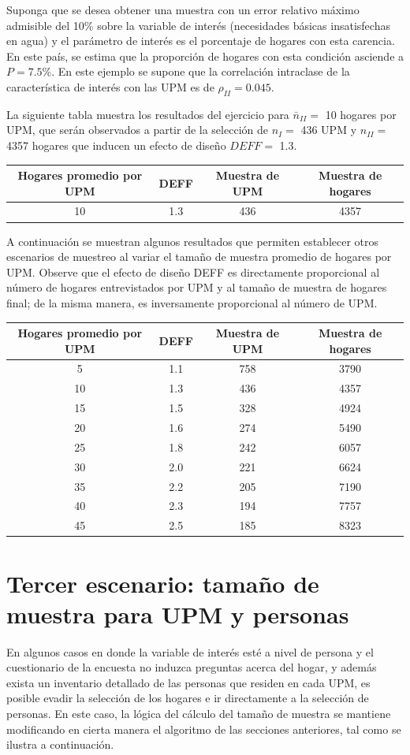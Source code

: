 \documentclass[12pt,spanish,]{book}
\begin{document}
Suponga que se desea obtener una muestra con un error relativo máximo admisible del 10\% sobre la variable de interés (necesidades básicas insatisfechas en agua) y el parámetro de interés es el porcentaje de hogares con esta carencia. En este país, se estima que la proporción de hogares con esta condición asciende a \(P = 7.5\)\%. En este ejemplo se supone que la correlación intraclase de la característica de interés con las UPM es de \(\rho_{II} = 0.045\).

La siguiente tabla muestra los resultados del ejercicio para \(\bar{n}_{II} =\) 10 hogares por UPM, que serán observados a partir de la selección de \(n_{I} =\) 436 UPM y \(n_{II} =\) 4357 hogares que inducen un efecto de diseño \(DEFF =\) 1.3.

\begin{longtable}[]{@{}cccc@{}}
\toprule
Hogares promedio por UPM & DEFF & Muestra de UPM & Muestra de hogares\tabularnewline
\midrule
\endhead
10 & 1.3 & 436 & 4357\tabularnewline
\bottomrule
\end{longtable}

A continuación se muestran algunos resultados que permiten establecer otros escenarios de muestreo al variar el tamaño de muestra promedio de hogares por UPM. Observe que el efecto de diseño DEFF es directamente proporcional al número de hogares entrevistados por UPM y al tamaño de muestra de hogares final; de la misma manera, es inversamente proporcional al número de UPM.

\begin{longtable}[]{@{}cccc@{}}
\toprule
Hogares promedio por UPM & DEFF & Muestra de UPM & Muestra de hogares\tabularnewline
\midrule
\endhead
5 & 1.1 & 758 & 3790\tabularnewline
10 & 1.3 & 436 & 4357\tabularnewline
15 & 1.5 & 328 & 4924\tabularnewline
20 & 1.6 & 274 & 5490\tabularnewline
25 & 1.8 & 242 & 6057\tabularnewline
30 & 2.0 & 221 & 6624\tabularnewline
35 & 2.2 & 205 & 7190\tabularnewline
40 & 2.3 & 194 & 7757\tabularnewline
45 & 2.5 & 185 & 8323\tabularnewline
\bottomrule
\end{longtable}

\hypertarget{tercer-escenario-tamano-de-muestra-para-upm-y-personas}{%
\section{Tercer escenario: tamaño de muestra para UPM y personas}\label{tercer-escenario-tamano-de-muestra-para-upm-y-personas}}

En algunos casos en donde la variable de interés esté a nivel de persona y el cuestionario de la encuesta no induzca preguntas acerca del hogar, y además exista un inventario detallado de las personas que residen en cada UPM, es posible evadir la selección de los hogares e ir directamente a la selección de personas. En este caso, la lógica del cálculo del tamaño de muestra se mantiene modificando en cierta manera el algoritmo de las secciones anteriores, tal como se ilustra a continuación.
\end{document}
